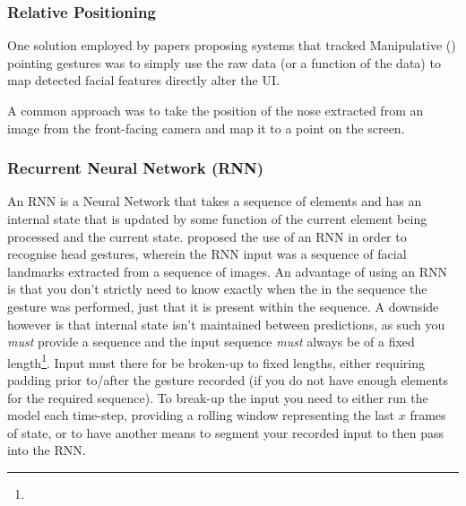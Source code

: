 \subsubsection{Relative Positioning}\nl
One solution employed by papers proposing systems that tracked Manipulative () pointing gestures was to simply use the raw data (or a function of the data) to map detected facial features directly alter the UI.

A common approach was to take the position of the nose extracted from an image from the front-facing camera and map it to a point on the screen\cite{gorodnichy2004nouse, roig2015face, varona2008hands}. 

\subsubsection{Recurrent Neural Network (RNN)}\nl
An RNN is a Neural Network that takes a sequence of elements and has an internal state that is updated by some function of the current element being processed and the current state.
\citeauthor{sharma2018recognizing} proposed the use of an RNN in order to recognise head gestures, wherein the RNN input was a sequence of facial landmarks extracted from a sequence of images\cite{sharma2018recognizing}. 
An advantage of using an RNN is that you don't strictly need to know exactly when the in the sequence the gesture was performed, just that it is present within the sequence.
A downside however is that internal state isn't maintained between predictions, as such you \textit{must} provide a sequence and the input sequence \textit{must} always be of a fixed length\footnote{}. Input must there for be broken-up to fixed lengths, either requiring padding prior to/after the gesture recorded (if you do not have enough elements for the required sequence). To break-up the input you need to either run the model each time-step, providing a rolling window representing the last $x$ frames of state, or to have another means to segment your recorded input to then pass into the RNN.

